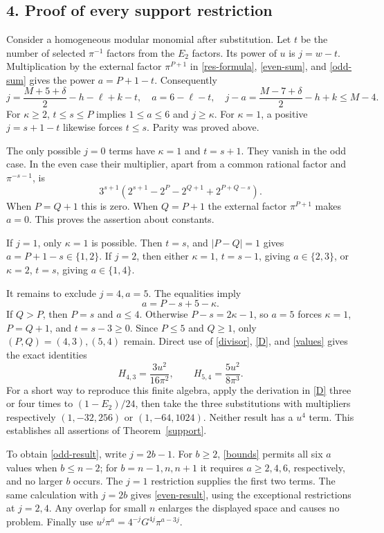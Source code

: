 \documentclass[11pt]{article}
\begin{document}
\subsection*{4. Proof of every support restriction}
Consider a homogeneous modular monomial after substitution. Let $t$
be the number of selected $\pi^{-1}$ factors from the $E_2$ factors.
Its power of $u$ is $j=w-t$. Multiplication by the external factor
$\pi^{P+1}$ in \eqref{res-formula}, \eqref{even-sum}, and
\eqref{odd-sum} gives the power $a=P+1-t$. Consequently
\begin{equation}\label{ja}
 j=\frac{M+5+\delta}{2}-h-\ell+k-t,\quad
 a=6-\ell-t,\quad
 j-a=\frac{M-7+\delta}{2}-h+k\le M-4.
\end{equation}
For $\kappa\ge2$, $t\le s\le P$ implies $1\le a\le6$ and
$j\ge\kappa$. For $\kappa=1$, a positive $j=s+1-t$ likewise
forces $t\le s$. Parity was proved above.

The only possible $j=0$ terms have $\kappa=1$ and $t=s+1$.
They vanish in the odd case. In the even case their multiplier,
apart from a common rational factor and $\pi^{-s-1}$, is
\[
 3^{s+1}\left(2^{s+1}-2^P-2^{Q+1}+2^{P+Q-s}\right).
\]
When $P=Q+1$ this is zero. When $Q=P+1$ the external factor
$\pi^{P+1}$ makes $a=0$. This proves the assertion about constants.

If $j=1$, only $\kappa=1$ is possible. Then $t=s$, and
$|P-Q|=1$ gives $a=P+1-s\in\{1,2\}$.
If $j=2$, then either $\kappa=1$, $t=s-1$, giving
$a\in\{2,3\}$, or $\kappa=2$, $t=s$, giving $a\in\{1,4\}$.

It remains to exclude $j=4,a=5$. The equalities imply
\[
 a=P-s+5-\kappa.
\]
If $Q>P$, then $P=s$ and $a\le4$. Otherwise
$P-s=2\kappa-1$, so $a=5$ forces $\kappa=1$,
$P=Q+1$, and $t=s-3\ge0$. Since $P\le5$ and $Q\ge1$,
only $(P,Q)=(4,3),(5,4)$ remain. Direct use of
\eqref{divisor}, \eqref{D}, and \eqref{values} gives the exact identities
\begin{equation}\label{cancellations}
 H_{4,3}=\frac{3u^2}{16\pi^2},\qquad
 H_{5,4}=\frac{5u^2}{8\pi^3}.
\end{equation}
For a short way to reproduce this finite algebra, apply the
derivation in \eqref{D} three or four times to $(1-E_2)/24$,
then take the three substitutions with multipliers respectively
$(1,-32,256)$ or $(1,-64,1024)$. Neither result has a $u^4$ term.
This establishes all assertions of Theorem~\ref{support}.

To obtain \eqref{odd-result}, write $j=2b-1$. For $b\ge2$,
\eqref{bounds} permits all six $a$ values when $b\le n-2$;
for $b=n-1,n,n+1$ it requires $a\ge2,4,6$, respectively,
and no larger $b$ occurs. The $j=1$ restriction supplies the first
two terms. The same calculation with $j=2b$ gives
\eqref{even-result}, using the exceptional restrictions at $j=2,4$.
Any overlap for small $n$ enlarges the displayed space and causes
no problem. Finally use $u^j\pi^a=4^{-j}G^{4j}\pi^{a-3j}$.
\end{document}
